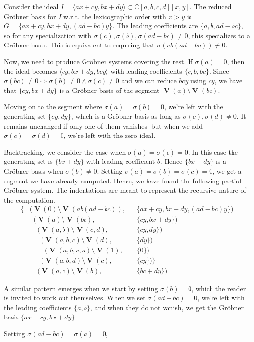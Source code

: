 \documentclass[a4paper, 12pt]{article}
\newcommand{\C}{\mathbb{C}}
\DeclareMathOperator{\V}{\mathbf V}
\theoremstyle{changedot}
\theoremstyle{changedotbreak}
\theoremstyle{nonumberplain}
\begin{document}
\begin{example}\upshape
  Consider the ideal $I = \langle ax + cy, bx + dy \rangle \subset \C[a, b, c, d][x, y]$. The reduced Gröbner basis for $I$ w.r.t. the lexicographic order with $x > y$ is $G = \{ax + cy, bx + dy, (ad - bc)y\}$. The leading coefficients are $\{a, b, ad - bc\}$, so for any specialization with $\sigma(a), \sigma(b), \sigma(ad - bc) \neq 0$, this specializes to a Gröbner basis. This is equivalent to requiring that $\sigma(ab(ad-bc)) \neq 0$.

  Now, we need to produce Gröbner systems covering the rest. If $\sigma(a) = 0$, then the ideal becomes $\langle cy, bx + dy, bcy \rangle$ with leading coefficients $\{c, b, bc\}$. Since $\sigma(bc) \neq 0 \iff \sigma(b) \neq 0 \land \sigma(c) \neq 0$ and we can reduce $bcy$ using $cy$, we have that $\{cy, bx + dy\}$ is a Gröbner basis of the segment $\V(a) \setminus \V(bc)$.

  Moving on to the segment where $\sigma(a) = \sigma(b) = 0$, we're left with the generating set $\{cy, dy\}$, which is a Gröbner basis as long as $\sigma(c), \sigma(d) \neq 0$. It remains unchanged if only one of them vanishes, but when we add $\sigma(c) = \sigma(d) = 0$, we're left with the zero ideal.

  Backtracking, we consider the case when $\sigma(a) = \sigma(c) = 0$. In this case the generating set is $\{bx + dy\}$ with leading coefficient $b$. Hence $\{bx + dy\}$ is a Gröbner basis when $\sigma(b) \neq 0$. Setting $\sigma(a) = \sigma(b) = \sigma(c) = 0$, we get a segment we have already computed. Hence, we have found the following partial Gröbner system. The indentations are meant to represent the recursive nature of the computation.
  \begin{align*}
    \{&(\V(0) \setminus \V(ab(ad-bc)),& &\{ax + cy, bx + dy, (ad-bc)y\}) \\
      &\;\; (\V(a) \setminus \V(bc),& &\{cy, bx + dy\}) \\
      &\;\; \;\;(\V(a, b) \setminus \V(c, d),& &\{cy, dy\}) \\
      &\;\; \;\; \;\;(\V(a, b, c) \setminus \V(d),& &\{dy\}) \\
      &\;\; \;\; \;\; \;\;(\V(a, b, c, d) \setminus \V(1),& &\{0\}) \\
      &\;\; \;\; \;\;(\V(a, b, d) \setminus \V(c),& &\{cy\})\}\\
      &\;\; \;\;(\V(a, c) \setminus \V(b), &&\{bc + dy\})
  \end{align*}

  A similar pattern emerges when we start by setting $\sigma(b) = 0$, which the reader is invited to work out themselves. When we set $\sigma(ad - bc) = 0$, we're left with the leading coefficients $\{a, b\}$, and when they do not vanish, we get the Gröbner basis $\{ax + cy, bx + dy\}$.

  Setting $\sigma(ad - bc) = \sigma(a) = 0$,

\end{example}
\end{document}
